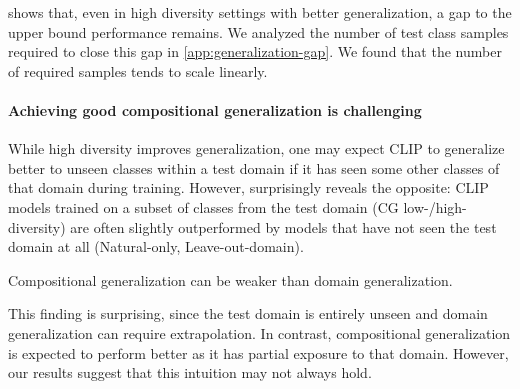  shows that, even in high diversity settings with better generalization, a gap to the upper bound performance remains. We analyzed the number of test class samples required to close this gap in \cref{app:generalization-gap}. We found that the number of required samples tends to scale linearly.
\begin{table}[t]
    \centering
    \caption{\textbf{There is a performance gap when CLIP has seen close class samples of the test domain.} With sufficient domain diversity, CLIP generalizes well to unseen classes $C_2$ of the clipart and sketch test domains $D_i$. However, even in these cases, there remains a gap compared to models also trained on domain-specific samples of the classes, \ie, $D^{C_2}_i$. \cref{app:generalization-gap} provides the results of the other domains.}
    \label{tab:generalization-gap}
\end{table}

\paragraph{Achieving good compositional generalization is challenging}\label{sec:cg-challenges}
While high diversity improves generalization, one may expect CLIP to generalize better to unseen classes within a test domain if it has seen some other classes of that domain during training. However,  surprisingly reveals the opposite: CLIP models trained on a subset of classes from the test domain (CG low-/high-diversity) are often slightly outperformed by models that have not seen the test domain at all (Natural-only, Leave-out-domain).
\begin{finding} 
    Compositional generalization can be weaker than domain generalization.
\end{finding}
This finding is surprising, since the test domain is entirely unseen and domain generalization can require extrapolation. In contrast, compositional generalization is expected to perform better as it has partial exposure to that domain. However, our results suggest that this intuition may not always hold.


